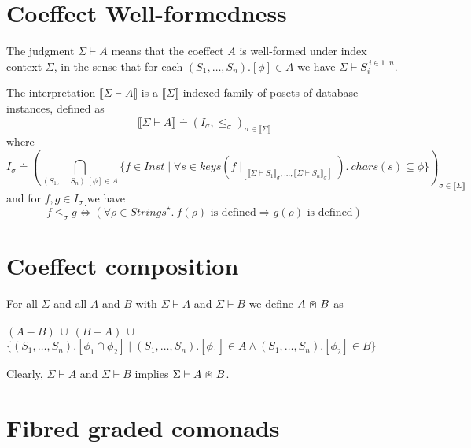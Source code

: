\documentclass{article}
\newcommand{\sem}[1]{\llbracket #1 \rrbracket}
\newcommand{\capdot}{~\stackinset{c}{}{c}{}{\scalebox{0.8}{$\ast$}}{$\cap$}~}
\newcommand{\sdisp}[1]{
\left( #1 \right)
}
\begin{document}
\section*{Coeffect Well-formedness}

The judgment $\Sigma \vdash A$ means that the coeffect $A$ is well-formed under index context $\Sigma$,
in the sense that for each $(S_1,\ldots,S_n).[\phi] \in A$ we have $\Sigma \vdash S_i^{~i \in 1..n}$.

The interpretation $\sem{\Sigma \vdash A}$ is a $\sem{\Sigma}$-indexed family of posets of database instances, defined as $$\sem{\Sigma \vdash A} \doteq (I_\sigma, \leq_\sigma)_{\sigma \in \sem{\Sigma}}$$ where $$I_\sigma \doteq \sdisp{\bigcap_{(S_1,\ldots,S_n).[\phi] \in A} \{ f \in \mathit{Inst} \mid \forall s \in \mathit{keys}(f \! \mid_{[\sem{\Sigma \vdash S_1}_\sigma, \ldots, \sem{\Sigma \vdash S_n}_\sigma]}).~\mathit{chars}(s) \subseteq \phi \}}_{\sigma \in \sem{\Sigma}}$$ and for $f,g \in I_{\sigma}$ we have
$$f \leq_\sigma g \overset{\cdot}{\Leftrightarrow} (\forall \rho \in \mathit{Strings}^\star.~f(\rho) \text{ is defined} \Rightarrow g(\rho) \text{ is defined})$$
 
\section*{Coeffect composition}

For all $\Sigma$ and all $A$ and $B$ with $\Sigma \vdash A$ and $\Sigma \vdash B$ we define $A \capdot B$ as\\~\\
$(A - B)~\cup~(B - A)~\cup$\\
$\{ (S_1,\ldots,S_n).[\phi_1 \cap \phi_2] \mid (S_1,\ldots,S_n).[\phi_1] \in A \wedge (S_1,\ldots,S_n).[\phi_2] \in B \}$ 

Clearly, $\Sigma \vdash A$ and $\Sigma \vdash B$ implies $\Sigma \vdash A \capdot B$. 
\section*{Fibred graded comonads}
 
\end{document}
